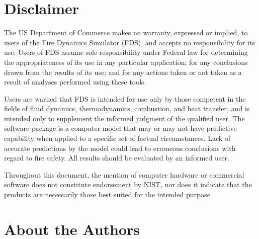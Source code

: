 \documentclass[11pt]{book}
\begin{document}
\chapter{Disclaimer}

The US Department of Commerce makes no warranty, expressed or implied, to
users of the Fire Dynamics Simulator (FDS), and accepts no responsibility for its
use. Users of FDS assume sole responsibility under Federal law for
determining the appropriateness of its use in any particular application;
for any conclusions drawn from the results of its use; and for any actions
taken or not taken as a result of analyses performed using these tools.

Users are warned that FDS is intended for use only by those competent in
the fields of fluid dynamics, thermodynamics, combustion, and heat transfer,
and is intended only to supplement the
informed judgment of the qualified user. The software package is a
computer model that may or may not have predictive capability when applied
to a specific set of factual circumstances. Lack of accurate predictions by
the model could lead to erroneous conclusions with regard to fire safety.
All results should be evaluated by an informed user.

Throughout this document, the mention of computer hardware or
commercial software does not constitute endorsement by NIST, nor does
it indicate that the products are necessarily those best suited for the
intended purpose.


\chapter{About the Authors}
\end{document}

